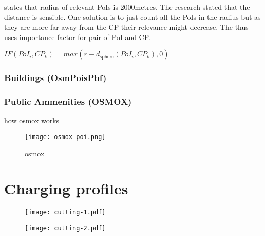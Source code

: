 \cite{hechtGlobalElectricVehicle2024} states that radius of relevant PoIs is 2000metres. The research stated that the distance is sensible.
One solution is to just count all the PoIs in the radius but as they are more far away from the CP their relevance might decrease. The \cite{hechtGlobalElectricVehicle2024} thus uses importance factor for pair of PoI and CP.

$IF(PoI_i, CP_k) = max(r-d_{\text{sphere}}(PoI_i, CP_k),0)$


\subsubsection{Buildings (OsmPoisPbf)}


\subsubsection{Public Ammenities (OSMOX)}

how osmox works
\begin{figure}[hb]
    \texttt{[image: osmox-poi.png]}
    \caption[osmox]{osmox}
    \label{fig:nn-latent}
\end{figure}


\section{Charging profiles}


\begin{figure}[hb]
    \texttt{[image: cutting-1.pdf]}
\end{figure}

\begin{figure}[hb]
    \texttt{[image: cutting-2.pdf]}
\end{figure}


\section{}